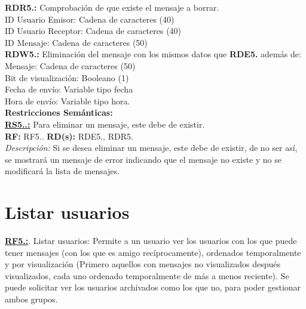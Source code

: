 \textcolor{azul}{\textbf{RDR5.\theRDR:}} Comprobación de que existe el mensaje a borrar. \\
\hspace*{1cm} ID Usuario Emisor: Cadena de caracteres (40) \\
\hspace*{1cm} ID Usuario Receptor: Cadena de caracteres (40) \\
\hspace*{1cm} ID Mensaje: Cadena de caracteres (50) \\[12pt]

\textcolor{azul}{\textbf{RDW5.\theRDW:}} Eliminación del mensaje con los mismos datos que \textcolor{azul}{\textbf{RDE5.\theRDE}} además de:
\hspace*{1cm} Mensaje: Cadena de caracteres (50) \\
\hspace*{1cm} Bit de visualización: Booleano (1) \\
\hspace*{1cm} Fecha de envío: Variable tipo fecha \\
\hspace*{1cm} Hora de envío: Variable tipo hora. \\[12pt]

\setcounter{RS}{1}
\textbf{\textcolor{verde}{Restricciones Semánticas:}} \\[6pt]
\textbf{\textcolor{verde}{\underline{RS5.\theRF.\theRS:}}} Para eliminar un mensaje, este debe de existir. \\
\textbf{RF:} RF5.\theRF. \textbf{RD(s):} RDE5.\theRDE, RDR5.\theRDR \\
\hspace*{1cm} \textit{Descripción:} Si se desea eliminar un mensaje, este debe de existir, de no ser así, se mostrará un mensaje de error indicando que el mensaje no existe y no se modificará la lista de mensajes. \\ [6pt]

\section{Listar usuarios}
\textbf{\textcolor{rojo}{\underline{RF5.\theRF:}}}. Listar usuarios: Permite a un usuario ver los usuarios con los que puede tener mensajes (con los que es amigo recíprocamente), ordenados temporalmente 
y por visualización (Primero aquellos con mensajes no visualizados después visualizados, cada uno ordenado temporalmente de más a menos reciente). Se puede solicitar ver los usuarios archivados como los que no, para poder 
gestionar ambos grupos.\\[6pt]

